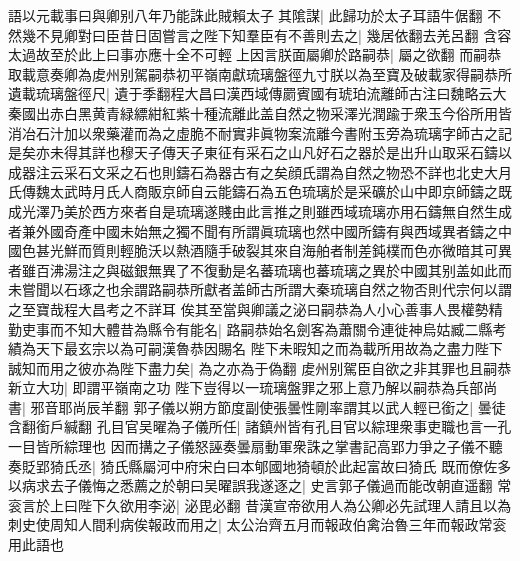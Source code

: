 語以元載事曰與卿别八年乃能誅此賊賴太子其隂謀|{
	此歸功於太子耳語牛倨翻}
不然幾不見卿對曰臣昔日固嘗言之陛下知羣臣有不善則去之|{
	幾居依翻去羌呂翻}
含容太過故至於此上曰事亦應十全不可輕上因言朕面屬卿於路嗣恭|{
	屬之欲翻}
而嗣恭取載意奏卿為䖍州别駕嗣恭初平嶺南獻琉璃盤徑九寸朕以為至寶及破載家得嗣恭所遺載琉璃盤徑尺|{
	遺于季翻程大昌曰漢西域傳罽賓國有琥珀流離師古注曰魏略云大秦國出赤白黑黄青緑縹紺紅紫十種流離此盖自然之物采澤光潤踰于衆玉今俗所用皆消冶石汁加以衆藥灌而為之虛脆不耐實非眞物案流離今書附玉旁為琉璃字師古之記是矣亦未得其詳也穆天子傳天子東征有采石之山凡好石之器於是出升山取采石鑄以成器注云采石文采之石也則鑄石為器古有之矣顔氏謂為自然之物恐不詳也北史大月氏傳魏太武時月氏人商販京師自云能鑄石為五色琉璃於是采礦於山中即京師鑄之既成光澤乃美於西方來者自是琉璃遂賤由此言推之則雖西域琉璃亦用石鑄無自然生成者兼外國奇產中國未始無之獨不聞有所謂眞琉璃也然中國所鑄有與西域異者鑄之中國色甚光鮮而質則輕脆沃以熱酒隨手破裂其來自海舶者制差鈍樸而色亦微暗其可異者雖百沸湯注之與磁銀無異了不復動是名蕃琉璃也蕃琉璃之異於中國其别盖如此而未嘗聞以石琢之也余謂路嗣恭所獻者盖師古所謂大秦琉璃自然之物否則代宗何以謂之至寶哉程大昌考之不詳耳}
俟其至當與卿議之泌曰嗣恭為人小心善事人畏權勢精勤吏事而不知大體昔為縣令有能名|{
	路嗣恭始名劍客為蕭關令連徙神烏姑臧二縣考績為天下最玄宗以為可嗣漢魯恭因賜名}
陛下未暇知之而為載所用故為之盡力陛下誠知而用之彼亦為陛下盡力矣|{
	為之亦為于偽翻}
䖍州别駕臣自欲之非其罪也且嗣恭新立大功|{
	即謂平嶺南之功}
陛下豈得以一琉璃盤罪之邪上意乃解以嗣恭為兵部尚書|{
	邪音耶尚辰羊翻}
郭子儀以朔方節度副使張曇性剛率謂其以武人輕已銜之|{
	曇徒含翻銜戶緘翻}
孔目官吴曜為子儀所任|{
	諸鎮州皆有孔目官以綜理衆事吏職也言一孔一目皆所綜理也}
因而搆之子儀怒誣奏曇扇動軍衆誅之掌書記高郢力爭之子儀不聽奏貶郢猗氏丞|{
	猗氏縣屬河中府宋白曰本郇國地猗頓於此起富故曰猗氏}
既而僚佐多以病求去子儀悔之悉薦之於朝曰吴曜誤我遂逐之|{
	史言郭子儀過而能改朝直遥翻}
常衮言於上曰陛下久欲用李泌|{
	泌毘必翻}
昔漢宣帝欲用人為公卿必先試理人請且以為刺史使周知人間利病俟報政而用之|{
	太公治齊五月而報政伯禽治魯三年而報政常衮用此語也}



